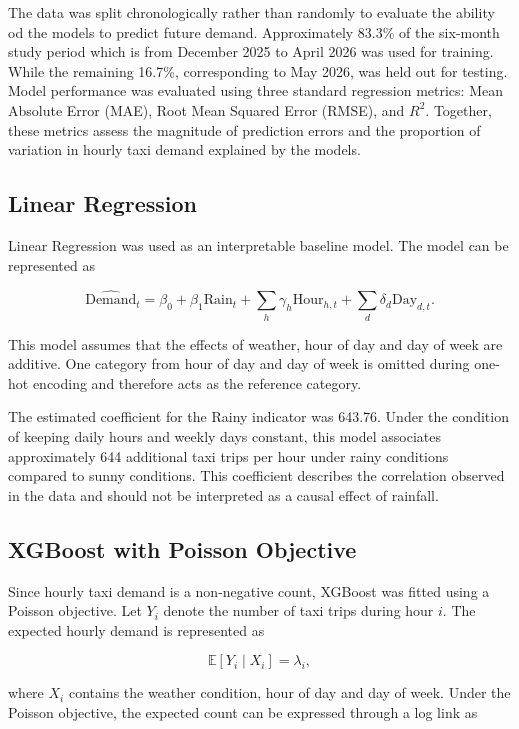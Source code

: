 \documentclass[11pt]{article}
\begin{document}
The data was split chronologically rather than randomly to evaluate the ability od the models to predict future demand. Approximately 83.3\% of the six-month study
period which is from December 2025 to April 2026 was used for training. While the remaining
16.7\%, corresponding to May 2026, was held out for testing. Model performance was evaluated using three standard regression metrics: Mean
Absolute Error (MAE), Root Mean Squared Error (RMSE), and $R^2$. Together, these
metrics assess the magnitude of prediction errors and the proportion of variation
in hourly taxi demand explained by the models.

\subsection{Linear Regression}

Linear Regression was used as an interpretable baseline model. The model can be
represented as

\[
\widehat{\text{Demand}}_t =
\beta_0 +
\beta_1 \text{Rain}_t +
\sum_h \gamma_h \text{Hour}_{h,t} +
\sum_d \delta_d \text{Day}_{d,t}.
\]

This model assumes that the effects of weather, hour of day and day of week are
additive. One category from hour of day and day of week is omitted during one-hot
encoding and therefore acts as the reference category.

The estimated coefficient for the Rainy indicator was 643.76. Under the condition of keeping daily hours and weekly days constant, this model associates approximately 644 additional taxi trips per hour under rainy conditions compared to sunny conditions. This coefficient describes the correlation observed in the data and should not be interpreted as a causal effect of rainfall.


\subsection{XGBoost with Poisson Objective}

Since hourly taxi demand is a non-negative count, XGBoost was fitted
using a Poisson objective. Let $Y_i$ denote the number of taxi trips during hour
$i$. The expected hourly demand is represented as

\[
\mathbb{E}[Y_i \mid X_i] = \lambda_i,
\]

where $X_i$ contains the weather condition, hour of day and day of week.
Under the Poisson objective, the expected count can be expressed through a log link as
\end{document}
